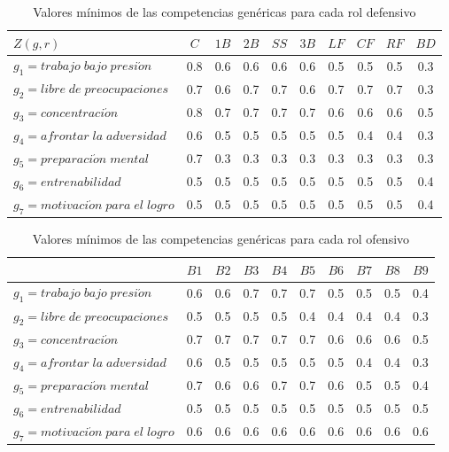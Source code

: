  
\begin{table}[H]
	\caption{Valores mínimos de las competencias genéricas para cada rol defensivo}\label{mcgd-pel}
	\centering
	\begin{tabular}{|l|c|c|c|c|c|c|c|c|c|}
		\hline
		$Z(g,r)$ & $C$ & $1B$  & $2B$ & $SS$ & $3B$ & $LF$ & $CF$ & $RF$ & $BD$ \\ \hline
		$g_1=trabajo\;bajo\;presi\acute{o}n$ & 0.8 & 0.6 & 0.6 & 0.6 & 0.6 & 0.5 & 0.5 & 0.5 & 0.3
		\\ \hline
		$g_2=libre\;de\;preocupaciones$ & 0.7 & 0.6 & 0.7 & 0.7 & 0.6 & 0.7 & 0.7 & 0.7 & 0.3\\ \hline
		$g_3=concentraci\acute{o}n$ & 0.8 & 0.7 & 0.7 & 0.7 & 0.7 & 0.6 & 0.6 & 0.6 & 0.5 \\ \hline
		$g_4=afrontar\;la\;adversidad$ & 0.6 & 0.5 & 0.5 & 0.5 & 0.5 & 0.5 & 0.4 & 0.4 & 0.3 \\ \hline
		$g_5=preparaci\acute{o}n\;mental$ & 0.7 & 0.3 & 0.3 & 0.3 & 0.3 & 0.3 & 0.3 & 0.3 & 0.3 \\ \hline
		$g_6=entrenabilidad$ & 0.5 & 0.5 & 0.5 & 0.5 & 0.5 & 0.5 & 0.5 & 0.5 & 0.4\\ \hline
		$g_7=motivaci\acute{o}n\;para\;el\;logro$ & 0.5 & 0.5 & 0.5 & 0.5 & 0.5 & 0.5 & 0.5 & 0.5 & 0.4\\ \hline
	\end{tabular}
\end{table}

\begin{table}[H]
	\caption{Valores mínimos de las competencias genéricas para cada rol ofensivo}\label{mcgo-pel}
	\centering
	\begin{tabular}{|l|c|c|c|c|c|c|c|c|c|}
		\hline
		\thead{$Z(g,r)$} & $B1$ & $B2$  & $B3$ & $B4$ & $B5$ & $B6$ & $B7$ & $B8$ & $B9$ \\ \hline
		$g_1=trabajo\;bajo\;presi\acute{o}n$ 	 & 0.6 	&  0.6 	&  0.7 &  0.7 &  0.7 &  0.5 &  0.5 & 0.5  & 0.4 \\ \hline
		$g_2=libre\;de\;preocupaciones$ 	 & 0.5  &  0.5  &  0.5 &  0.5 &  0.4 &  0.4 &  0.4 & 0.4  & 0.3 \\ \hline
		$g_3=concentraci\acute{o}n$ 	 & 0.7  &  0.7  &  0.7 &  0.7 &  0.7 &  0.6 &  0.6 & 0.6  & 0.5 \\ \hline
		$g_4=afrontar\;la\;adversidad$ 	 & 0.6  &  0.5  &  0.5 &  0.5 &  0.5 &  0.5 &  0.4 & 0.4  & 0.3 \\ \hline
		$g_5=preparaci\acute{o}n\;mental$ 	 & 0.7  &  0.6  &  0.6 &  0.7 &  0.7 &  0.6 &  0.5 & 0.5  & 0.4 \\ \hline
		$g_6=entrenabilidad$ 	 & 0.5  &  0.5  &  0.5 &  0.5 &  0.5 &  0.5 &  0.5 & 0.5  & 0.5 \\ \hline
		$g_7=motivaci\acute{o}n\;para\;el\;logro$ 	 & 0.6  &  0.6  &  0.6 &  0.6 &  0.6 &  0.6 &  0.6 & 0.6  & 0.6 \\ \hline
	\end{tabular}
\end{table}


